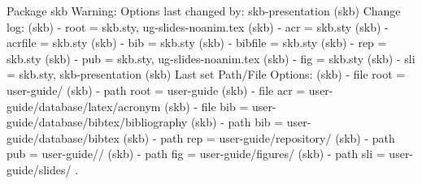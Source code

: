 Package skb Warning: Options last changed by: skb-presentation
(skb)                Change log:
(skb)                - root = skb.sty, ug-slides-noanim.tex
(skb)                - acr = skb.sty
(skb)                - acrfile = skb.sty
(skb)                - bib = skb.sty
(skb)                - bibfile = skb.sty
(skb)                - rep = skb.sty
(skb)                - pub = skb.sty, ug-slides-noanim.tex
(skb)                - fig = skb.sty
(skb)                - sli = skb.sty, skb-presentation
(skb)                Last set Path/File Options:
(skb)                - file root = user-guide/
(skb)                - path root = user-guide
(skb)                - file acr = user-guide/database/latex/acronym
(skb)                - file bib = user-guide/database/bibtex/bibliography
(skb)                - path bib = user-guide/database/bibtex
(skb)                - path rep = user-guide/repository/
(skb)                - path pub = user-guide//
(skb)                - path fig = user-guide/figures/
(skb)                - path sli = user-guide/slides/ .